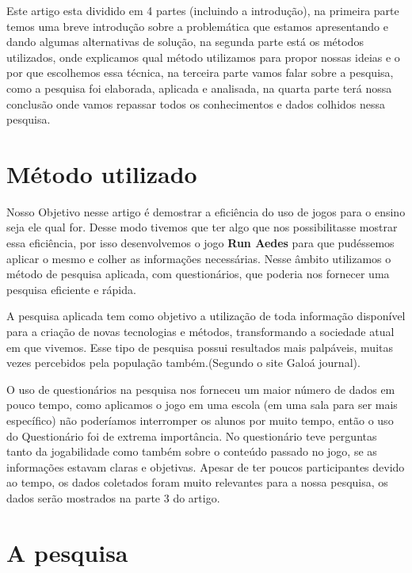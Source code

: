 \documentclass[12pt]{article}
\begin{document}
	Este artigo esta dividido em 4 partes (incluindo a introdução), na primeira parte temos uma breve introdução sobre a problemática que estamos apresentando e dando algumas alternativas de solução, na segunda parte está os métodos utilizados, onde explicamos qual método utilizamos para propor nossas ideias e o por que escolhemos essa técnica, na terceira parte vamos falar sobre a pesquisa, como a pesquisa foi elaborada, aplicada e analisada, na quarta parte terá nossa conclusão onde vamos repassar todos os conhecimentos e dados colhidos nessa pesquisa.
	
		
		
	\section{Método utilizado}%
	Nosso Objetivo nesse artigo é demostrar a eficiência do uso de jogos para o ensino seja ele qual for. Desse modo tivemos que ter algo que nos possibilitasse mostrar essa eficiência, por isso desenvolvemos o jogo \textbf{Run Aedes} para que pudéssemos aplicar o mesmo e colher as informações necessárias. Nesse âmbito utilizamos o método de pesquisa aplicada, com questionários, que poderia nos fornecer uma pesquisa eficiente e rápida.
	
	A pesquisa aplicada tem como objetivo a utilização de toda informação disponível para a criação de novas tecnologias e métodos, transformando a sociedade atual em que vivemos. Esse tipo de pesquisa possui resultados mais palpáveis, muitas vezes percebidos pela população também.(Segundo o site Galoá journal).
	
	O uso de questionários na pesquisa nos forneceu um maior número de dados em pouco tempo, como aplicamos o jogo em uma escola (em uma sala para ser mais específico) não poderíamos interromper os alunos por muito tempo, então o uso do Questionário foi de extrema importância. No questionário teve perguntas tanto da jogabilidade como também sobre o conteúdo passado no jogo, se as informações estavam claras e objetivas. Apesar de ter poucos participantes devido ao tempo, os dados coletados foram muito relevantes para a nossa pesquisa, os dados serão mostrados na parte 3 do artigo.
	
	
	
	\section{A pesquisa} %
	
\end{document}

